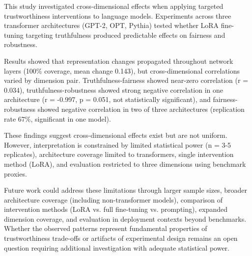 
This study investigated cross-dimensional effects when applying targeted trustworthiness interventions to language models. Experiments across three transformer architectures (GPT-2, OPT, Pythia) tested whether LoRA fine-tuning targeting truthfulness produced predictable effects on fairness and robustness.

Results showed that representation changes propagated throughout network layers (100\% coverage, mean change 0.143), but cross-dimensional correlations varied by dimension pair. Truthfulness-fairness showed near-zero correlation (r = 0.034), truthfulness-robustness showed strong negative correlation in one architecture (r = -0.997, p = 0.051, not statistically significant), and fairness-robustness showed negative correlation in two of three architectures (replication rate 67\%, significant in one model).

These findings suggest cross-dimensional effects exist but are not uniform. However, interpretation is constrained by limited statistical power (n = 3-5 replicates), architecture coverage limited to transformers, single intervention method (LoRA), and evaluation restricted to three dimensions using benchmark proxies.

Future work could address these limitations through larger sample sizes, broader architecture coverage (including non-transformer models), comparison of intervention methods (LoRA vs. full fine-tuning vs. prompting), expanded dimension coverage, and evaluation in deployment contexts beyond benchmarks. Whether the observed patterns represent fundamental properties of trustworthiness trade-offs or artifacts of experimental design remains an open question requiring additional investigation with adequate statistical power.
